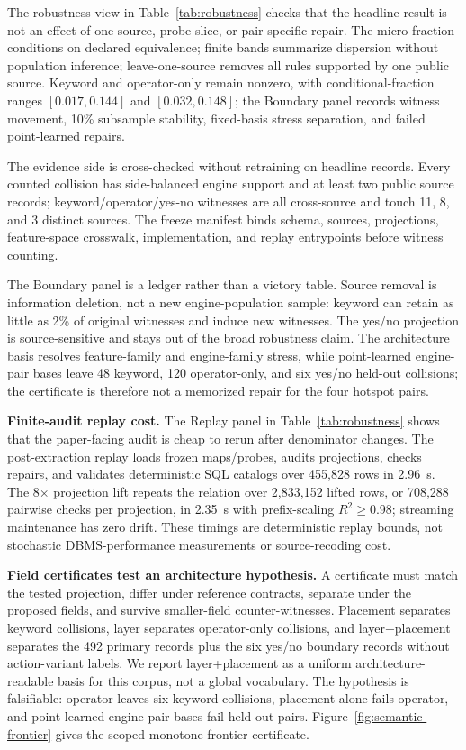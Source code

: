 

The robustness view in Table~\ref{tab:robustness} checks that the headline result is not an effect of one source, probe slice, or pair-specific repair.  The micro fraction conditions on declared equivalence; finite bands summarize dispersion without population inference; leave-one-source removes all rules supported by one public source.  Keyword and operator-only remain nonzero, with conditional-fraction ranges $[0.017,0.144]$ and $[0.032,0.148]$; the Boundary panel records witness movement, 10\% subsample stability, fixed-basis stress separation, and failed point-learned repairs.



The evidence side is cross-checked without retraining on headline records.  Every counted collision has side-balanced engine support and at least two public source records; keyword/operator/yes-no witnesses are all cross-source and touch 11, 8, and 3 distinct sources.  The freeze manifest binds schema, sources, projections, feature-space crosswalk, implementation, and replay entrypoints before witness counting.

The Boundary panel is a ledger rather than a victory table.  Source removal is information deletion, not a new engine-population sample: keyword can retain as little as 2\% of original witnesses and induce new witnesses.  The yes/no projection is source-sensitive and stays out of the broad robustness claim.  The architecture basis resolves feature-family and engine-family stress, while point-learned engine-pair bases leave 48 keyword, 120 operator-only, and six yes/no held-out collisions; the certificate is therefore not a memorized repair for the four hotspot pairs.

\textbf{Finite-audit replay cost.}  The Replay panel in Table~\ref{tab:robustness} shows that the paper-facing audit is cheap to rerun after denominator changes.  The post-extraction replay loads frozen maps/probes, audits projections, checks repairs, and validates deterministic SQL catalogs over 455,828 rows in 2.96~s.  The 8$\times$ projection lift repeats the relation over 2,833,152 lifted rows, or 708,288 pairwise checks per projection, in 2.35~s with prefix-scaling $R^2\geq0.98$; streaming maintenance has zero drift.  These timings are deterministic replay bounds, not stochastic DBMS-performance measurements or source-recoding cost.

\textbf{Field certificates test an architecture hypothesis.} A certificate must match the tested projection, differ under reference contracts, separate under the proposed fields, and survive smaller-field counter-witnesses.  Placement separates keyword collisions, layer separates operator-only collisions, and layer+placement separates the 492 primary records plus the six yes/no boundary records without action-variant labels.  We report layer+placement as a uniform architecture-readable basis for this corpus, not a global vocabulary.  The hypothesis is falsifiable: operator leaves six keyword collisions, placement alone fails operator, and point-learned engine-pair bases fail held-out pairs.  Figure~\ref{fig:semantic-frontier} gives the scoped monotone frontier certificate.

